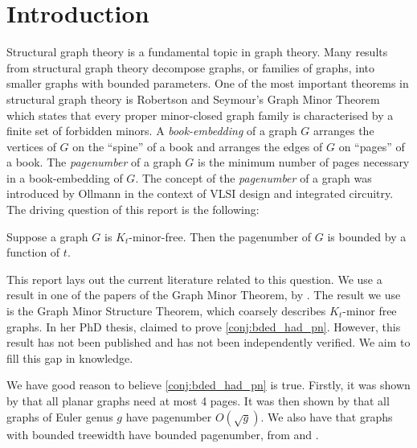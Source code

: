 \chapter{Introduction}\label{sec:introduction}
Structural graph theory is a fundamental topic in graph theory. Many results from structural graph theory decompose graphs, or families of graphs, into smaller graphs with bounded parameters. One of the most important theorems in structural graph theory is Robertson and Seymour's Graph Minor Theorem \cite{robertsonGraphMinorsXX2004} which states that every proper minor-closed graph family is characterised by a finite set of forbidden minors.
A \textit{book-embedding} of a graph $G$ arranges the vertices of $G$ on the ``spine'' of a book and arranges the edges of $G$ on ``pages'' of a book. The \textit{pagenumber} of a graph \(G\) is the minimum number of pages necessary in a book-embedding of \(G\). The concept of the \textit{pagenumber} of a graph was introduced by Ollmann \cite{ollmannBookThicknessVarious1973} in the context of VLSI design and integrated circuitry. 
The driving question of this report is the following:
\begin{conjecture}\label{conj:bded_had_pn}
	Suppose a graph $G$ is $K_t$-minor-free. Then the pagenumber of \(G\) is bounded by a function of \(t\).
\end{conjecture}
This report lays out the current literature related to this question. We use a result in one of the papers of the Graph Minor Theorem, by \textcite{robertsonGraphMinorsXVI2003}. The result we use is the Graph Minor Structure Theorem, which coarsely describes $K_t$-minor free graphs.
In her PhD thesis, \textcite{Blankenship-PhD03} claimed to prove \cref{conj:bded_had_pn}. However, this result has not been published and has not been independently verified. We aim to fill this gap in knowledge.

We have good reason to believe \cref{conj:bded_had_pn} is true. Firstly, it was shown by \textcite{yannakakisEmbeddingPlanarGraphs1989} that all planar graphs need at most 4 pages. It was then shown by \textcite{malitzGenusGraphsHave1994} that all graphs of Euler genus $g$ have pagenumber $O(\sqrt{g})$. We also have that graphs with bounded treewidth have bounded pagenumber, from \textcite{ganleyPagenumberTrees2001} and \textcite{dujmovicGraphTreewidthGeometric2007}.
